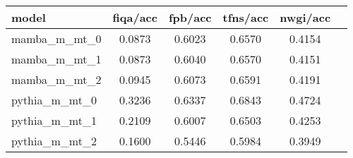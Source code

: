 \begin{tabular}{lccccc}
\toprule
model & fiqa/acc & fpb/acc & tfns/acc & nwgi/acc \\
\midrule
mamba\_m\_mt\_0 & 0.0873 & 0.6023 & 0.6570 & 0.4154 \\
mamba\_m\_mt\_1 & 0.0873 & 0.6040 & 0.6570 & 0.4151 \\
mamba\_m\_mt\_2 & 0.0945 & 0.6073 & 0.6591 & 0.4191 \\
pythia\_m\_mt\_0 & 0.3236 & 0.6337 & 0.6843 & 0.4724 \\
pythia\_m\_mt\_1 & 0.2109 & 0.6007 & 0.6503 & 0.4253 \\
pythia\_m\_mt\_2 & 0.1600 & 0.5446 & 0.5984 & 0.3949 \\
\bottomrule
\end{tabular}

